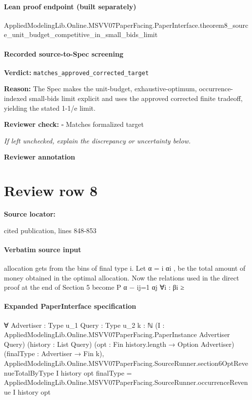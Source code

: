 \documentclass[10pt]{article}
\newcommand{\reviewerbox}{%
  \par\noindent\fbox{\parbox{0.96\linewidth}{\rule{0pt}{0.38in}}}\par
}
\newcommand{\reviewmatch}[1]{%
  \par\noindent\textbf{Reviewer check:} $\square$\; #1\par
  \noindent\emph{If left unchecked, explain the discrepancy or uncertainty below.}\par
}
\begin{document}
\paragraph{Lean proof endpoint (built separately)}\begin{ReviewVerbatim}
AppliedModelingLib.Online.MSVV07PaperFacing.PaperInterface.theorem8_source_unit_budget_competitive_in_small_bids_limit
\end{ReviewVerbatim}

\paragraph{Recorded source-to-Spec screening}
\textbf{Verdict:} \texttt{matches\_approved\_corrected\_target}
\\
{\raggedright
\textbf{Reason:} The Spec makes the unit-\allowbreak{}budget, exhaustive-\allowbreak{}optimum, occurrence-\allowbreak{}indexed small-\allowbreak{}bids limit explicit and uses the approved corrected finite tradeoff, yielding the stated 1-\allowbreak{}1/\allowbreak{}e limit.\allowbreak{}
\par}
\reviewmatch{Matches formalized target}
\noindent\textbf{Reviewer annotation}\par
\reviewerbox
\clearpage
\hypertarget{source-claim-5bf839489e4b6356}{}
\section*{Review row 8}
\textbf{Source locator:} {\footnotesize\raggedright cited publication, lines 848-\allowbreak{}853\par}
\paragraph{Verbatim source input}
\begin{ReviewVerbatim}
allocation gets from the bins of final type i. Let α = i αi , be the total amount of money
obtained in the optimal allocation.
Now the relations used in the direct proof at the end of Section 5 become
P
α − ij=1 αj
∀i : βi ≥
\end{ReviewVerbatim}



\paragraph{Expanded PaperInterface specification}
\begin{ReviewVerbatim}
∀ {Advertiser : Type u_1} {Query : Type u_2} {k : ℕ}
  (I : AppliedModelingLib.Online.MSVV07PaperFacing.PaperInstance Advertiser Query) (history : List Query)
  (opt : Fin history.length → Option Advertiser) (finalType : Advertiser → Fin k),
  AppliedModelingLib.Online.MSVV07PaperFacing.SourceRunner.section6OptRevenueTotalByType I history opt finalType =
    AppliedModelingLib.Online.MSVV07PaperFacing.SourceRunner.occurrenceRevenue I history opt
\end{ReviewVerbatim}
\end{document}

